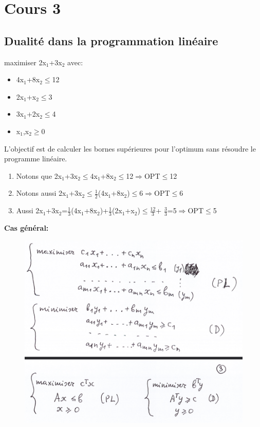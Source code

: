 \section{Cours 3}
\subsection{Dualité dans la programmation linéaire}
maximiser 2x$_1$+3x$_2$ avec:
\begin{itemize}
	\item 4x$_1$+8x$_2\leq$12
	\item 2x$_1$+x$_2\leq$3
	\item 3x$_1$+2x$_2\leq$4
	\item x$_1$,x$_2\geq$0
\end{itemize}
L'objectif est de calculer les bornes supérieures pour l'optimum sans résoudre le programme linéaire.
\begin{enumerate}
	\item Notons que 2x$_1$+3x$_2\leq$4x$_1$+8x$_2\leq$12$\Rightarrow$OPT$\leq$12
	\item Notons aussi 2x$_1$+3x$_2\leq\frac{1}{2}$(4x$_1$+8x$_2$)$\leq$6$\Rightarrow$OPT$\leq$6
	\item Aussi 2x$_1$+3x$_2$=$\frac{1}{3}$(4x$_1$+8x$_2$)+$\frac{1}{3}$(2x$_1$+x$_2$)$\leq\frac{12}{3}$+
	$\frac{3}{3}$=5$\Rightarrow$OPT$\leq$5
\end{enumerate}
\newpage
\textbf{Cas général:}
\begin{figure}[h!]
\includegraphics[width=\linewidth,height=0.75\textheight]{notes/algorithme/cas_general_dualite.png}
\end{figure}
